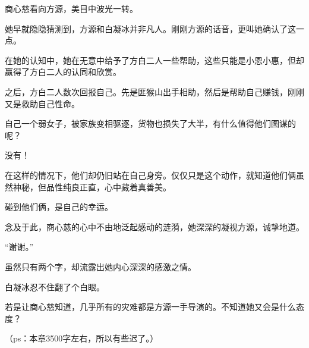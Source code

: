 \begin{this_body}
商心慈看向方源，美目中波光一转。

她早就隐隐猜测到，方源和白凝冰并非凡人。刚刚方源的话音，更叫她确认了这一点。

在她的认知中，她在无意中给予了方白二人一些帮助，这些只能是小恩小惠，但却赢得了方白二人的认同和欣赏。

之后，方白二人数次回报自己。先是匪猴山出手相助，然后是帮助自己赚钱，刚刚又是救助自己性命。

自己一个弱女子，被家族变相驱逐，货物也损失了大半，有什么值得他们图谋的呢？

没有！

在这样的情况下，他们却仍旧站在自己身旁。仅仅只是这个动作，就知道他们俩虽然神秘，但品性纯良正直，心中藏着真善美。

碰到他们俩，是自己的幸运。

念及于此，商心慈的心中不由地泛起感动的涟漪，她深深的凝视方源，诚挚地道。

“谢谢。”

虽然只有两个字，却流露出她内心深深的感激之情。

白凝冰忍不住翻了个白眼。

若是让商心慈知道，几乎所有的灾难都是方源一手导演的。不知道她又会是什么态度？

（ps：本章3500字左右，所以有些迟了。）

\end{this_body}

